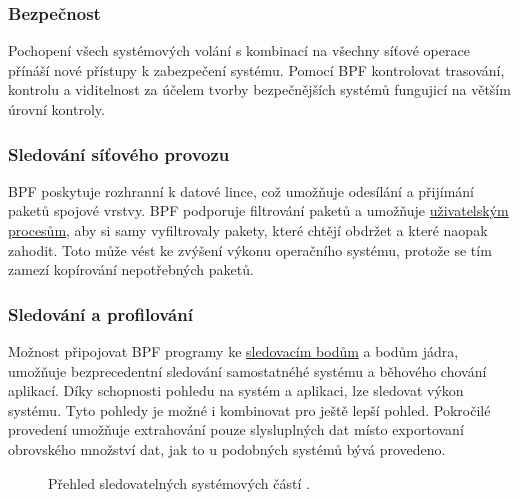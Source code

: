 \subsubsection*{Bezpečnost}

Pochopení všech systémových volání s kombinací na všechny síťové operace přínáší nové přístupy k zabezpečení systému. Pomocí BPF kontrolovat trasování, kontrolu a viditelnost za účelem tvorby bezpečnějších systémů fungujicí na větším úrovní kontroly.

\subsubsection*{Sledování síťového provozu}

BPF poskytuje rozhranní k datové lince, což umožňuje odesílání a přijímání paketů spojové vrstvy. BPF podporuje filtrování paketů a umožňuje \hyperref[sec:UzivatelskeProcesy]{uživatelským procesům},
aby si samy vyfiltrovaly pakety, které chtějí obdržet a které naopak zahodit. Toto může vést ke zvýšení výkonu operačního systému, protože se tím zamezí kopírování nepotřebných paketů.

\subsubsection*{Sledování a profilování}

Možnost připojovat BPF programy ke \hyperref[sec:SledovaciBod]{sledovacím bodům} a bodům jádra, umožňuje bezprecedentní sledování samostatnéhé systému a běhového chování aplikací. Díky schopnosti pohledu na systém a aplikaci, lze sledovat výkon systému. Tyto pohledy je možné i kombinovat pro ještě lepší pohled. Pokročilé provedení umožňuje extrahování pouze slysluplných dat místo exportovaní obrovského množství dat, jak to u podobných systémů bývá provedeno.

\begin{figure}[ht]
  \centering
  \caption{Přehled sledovatelných systémových částí \cite{BPFPerformanceTools}.}
  \label{pic:observable}
\end{figure}

